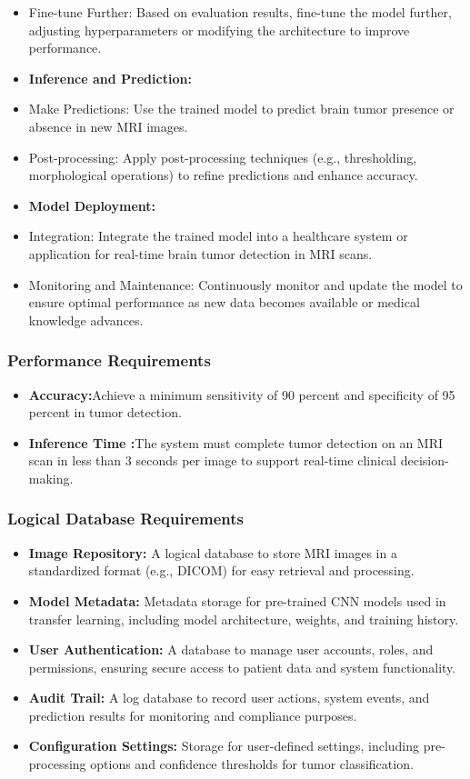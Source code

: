 \begin{itemize}
    \item Fine-tune Further:  Based on evaluation results, fine-tune the model further, adjusting hyperparameters or modifying the architecture to improve performance.      \item \textbf {Inference and Prediction:}
    \item Make Predictions:  Use the trained model to predict brain tumor presence or absence in new MRI images.
    \item Post-processing:  Apply post-processing techniques (e.g., thresholding, morphological operations) to refine predictions and enhance accuracy.                         \item \textbf {Model Deployment:}
    \item Integration:  Integrate the trained model into a healthcare system or application for real-time brain tumor detection in MRI scans.
    \item Monitoring and Maintenance:  Continuously monitor and update the model to ensure optimal performance as new data becomes available or medical knowledge advances.
\end{itemize}
\subsubsection{Performance Requirements}
\begin{itemize}
    \item \textbf{Accuracy:}Achieve a minimum sensitivity of 90 percent and specificity of 95 percent in tumor detection.
    \item \textbf{Inference Time :}The system must complete tumor detection on an MRI scan in less than 3 seconds per image to support real-time clinical decision-making.
\end{itemize}
\subsubsection{Logical Database Requirements}
\begin{itemize}
    \item \textbf{Image Repository:} A logical database to store MRI images in a standardized format (e.g., DICOM) for easy retrieval and processing.
    \item \textbf{Model Metadata:} Metadata storage for pre-trained CNN models used in transfer learning, including model architecture, weights, and training history.
    \item \textbf{User Authentication:} A database to manage user accounts, roles, and permissions, ensuring secure access to patient data and system functionality.
    \item \textbf{Audit Trail:} A log database to record user actions, system events, and prediction results for monitoring and compliance purposes.
    \item \textbf{Configuration Settings:} Storage for user-defined settings, including pre-processing options and confidence thresholds for tumor classification.
\end{itemize}
